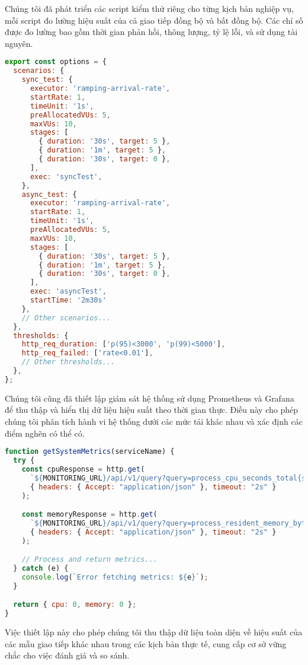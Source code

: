 Chúng tôi đã phát triển các script kiểm thử riêng cho từng kịch bản nghiệp vụ, mỗi script đo lường hiệu suất của cả giao tiếp đồng bộ và bất đồng bộ. Các chỉ số được đo lường bao gồm thời gian phản hồi, thông lượng, tỷ lệ lỗi, và sử dụng tài nguyên.

\begin{lstlisting}[language=Javascript]
export const options = {
  scenarios: {
    sync_test: {
      executor: 'ramping-arrival-rate',
      startRate: 1,
      timeUnit: '1s',
      preAllocatedVUs: 5,
      maxVUs: 10,
      stages: [
        { duration: '30s', target: 5 },
        { duration: '1m', target: 5 },
        { duration: '30s', target: 0 },
      ],
      exec: 'syncTest',
    },
    async_test: {
      executor: 'ramping-arrival-rate',
      startRate: 1,
      timeUnit: '1s',
      preAllocatedVUs: 5,
      maxVUs: 10,
      stages: [
        { duration: '30s', target: 5 },
        { duration: '1m', target: 5 },
        { duration: '30s', target: 0 },
      ],
      exec: 'asyncTest',
      startTime: '2m30s'
    },
    // Other scenarios...
  },
  thresholds: {
    http_req_duration: ['p(95)<3000', 'p(99)<5000'],
    http_req_failed: ['rate<0.01'],
    // Other thresholds...
  },
};
\end{lstlisting}

Chúng tôi cũng đã thiết lập giám sát hệ thống sử dụng Prometheus và Grafana để thu thập và hiển thị dữ liệu hiệu suất theo thời gian thực. Điều này cho phép chúng tôi phân tích hành vi hệ thống dưới các mức tải khác nhau và xác định các điểm nghẽn có thể có.

\begin{lstlisting}[language=Javascript]
function getSystemMetrics(serviceName) {
  try {
    const cpuResponse = http.get(
      `${MONITORING_URL}/api/v1/query?query=process_cpu_seconds_total{service="${serviceName}"}`,
      { headers: { Accept: "application/json" }, timeout: "2s" }
    );

    const memoryResponse = http.get(
      `${MONITORING_URL}/api/v1/query?query=process_resident_memory_bytes{service="${serviceName}"}`,
      { headers: { Accept: "application/json" }, timeout: "2s" }
    );

    // Process and return metrics...
  } catch (e) {
    console.log(`Error fetching metrics: ${e}`);
  }

  return { cpu: 0, memory: 0 };
}
\end{lstlisting}

Việc thiết lập này cho phép chúng tôi thu thập dữ liệu toàn diện về hiệu suất của các mẫu giao tiếp khác nhau trong các kịch bản thực tế, cung cấp cơ sở vững chắc cho việc đánh giá và so sánh.
